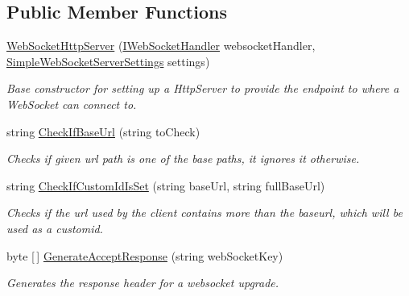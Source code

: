 \subsection*{Public Member Functions}
\begin{DoxyCompactItemize}
\item 
\mbox{\hyperlink{class_simple_web_socket_server_library_1_1_simple_web_socket_http_server_1_1_web_socket_http_server_aa8e23540cfef48f5304591d1251f0f63}{Web\+Socket\+Http\+Server}} (\mbox{\hyperlink{interface_simple_web_socket_server_library_1_1_simple_web_socket_handler_1_1_i_web_socket_handler}{I\+Web\+Socket\+Handler}} websocket\+Handler, \mbox{\hyperlink{class_simple_web_socket_server_library_1_1_simple_web_socket_server_settings}{Simple\+Web\+Socket\+Server\+Settings}} settings)
\begin{DoxyCompactList}\small\item\em Base constructor for setting up a Http\+Server to provide the endpoint to where a Web\+Socket can connect to. \end{DoxyCompactList}\item 
string \mbox{\hyperlink{class_simple_web_socket_server_library_1_1_simple_web_socket_http_server_1_1_web_socket_http_server_afc1c8b7fbec382f17e02bc5a6a1d0623}{Check\+If\+Base\+Url}} (string to\+Check)
\begin{DoxyCompactList}\small\item\em Checks if given url path is one of the base paths, it ignores it otherwise. \end{DoxyCompactList}\item 
string \mbox{\hyperlink{class_simple_web_socket_server_library_1_1_simple_web_socket_http_server_1_1_web_socket_http_server_ad03927a5f521986b6fdbd1ee2c5d77ba}{Check\+If\+Custom\+Id\+Is\+Set}} (string base\+Url, string full\+Base\+Url)
\begin{DoxyCompactList}\small\item\em Checks if the url used by the client contains more than the baseurl, which will be used as a customid. \end{DoxyCompactList}\item 
byte \mbox{[}$\,$\mbox{]} \mbox{\hyperlink{class_simple_web_socket_server_library_1_1_simple_web_socket_http_server_1_1_web_socket_http_server_a069af261c2eea78d3c3b75a39f97ea15}{Generate\+Accept\+Response}} (string web\+Socket\+Key)
\begin{DoxyCompactList}\small\item\em Generates the response header for a websocket upgrade. \end{DoxyCompactList}\item 

\end{DoxyCompactItemize}
